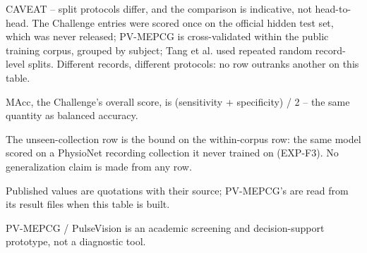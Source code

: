 \begin{table}[htbp]
\begin{tabular}{lrrrrrr}
    \bottomrule
  \end{tabular}
  \par\footnotesize CAVEAT -- split protocols differ, and the comparison is indicative, not head-to-head. The Challenge entries were scored once on the official hidden test set, which was never released; PV-MEPCG is cross-validated within the public training corpus, grouped by subject; Tang et al. used repeated random record-level splits. Different records, different protocols: no row outranks another on this table.
  \par\footnotesize MAcc, the Challenge's overall score, is (sensitivity + specificity) / 2 -- the same quantity as balanced accuracy.
  \par\footnotesize The unseen-collection row is the bound on the within-corpus row: the same model scored on a PhysioNet recording collection it never trained on (EXP-F3). No generalization claim is made from any row.
  \par\footnotesize Published values are quotations with their source; PV-MEPCG's are read from its result files when this table is built.
  \par\footnotesize PV-MEPCG / PulseVision is an academic screening and decision-support prototype, not a diagnostic tool.
\end{table}

